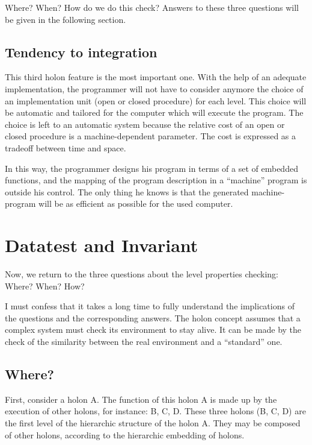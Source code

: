 \documentclass[openany,nobib]{tufte-book}
\begin{document}
Where? When? How do we do this check? Answers to these three questions will be
given in the following section.

\section{Tendency to integration}

This third holon feature is the most important one. With the help of an
adequate implementation, the programmer will not have to consider anymore the
choice of an implementation unit (open or closed procedure) for each level.
This choice will be automatic and tailored for the computer which will execute
the program. The choice is left to an automatic system because the relative
cost of an open or closed procedure is a machine-dependent parameter. The cost
is expressed as a tradeoff between time and space.

In this way, the programmer designs his program in terms of a set of embedded
functions, and the mapping of the program description in a ``machine'' program
is outside his control. The only thing he knows is that the generated
machine-program will be as efficient as possible for the used computer.

\chapter{Datatest and Invariant}

Now, we return to the three questions about the level properties checking:
Where? When? How?

I must confess that it takes a long time to fully understand the implications
of the questions and the corresponding answers. The holon concept assumes that
a complex system must check its environment to stay alive. It can be made by
the check of the similarity between the real environment and a ``standard''
one.

\section{Where?}

First, consider a holon A. The function of this holon A is made up by the
execution of other holons, for instance: B, C, D. These three holons (B, C, D)
are the first level of the hierarchic structure of the holon A. They may be
composed of other holons, according to the hierarchic embedding of holons.
\end{document}
